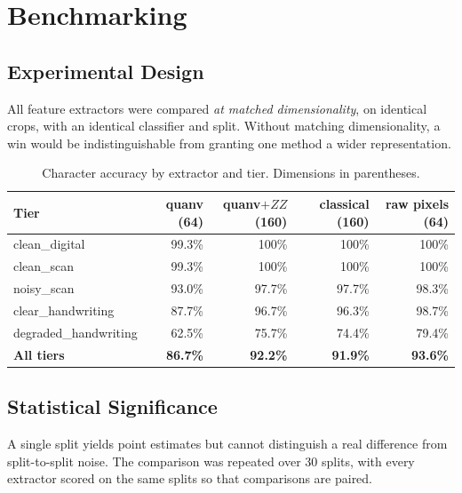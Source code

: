 \documentclass[11pt,a4paper]{article}
\begin{document}
\section{Benchmarking}
\label{sec:features}

\subsection{Experimental Design}

All feature extractors were compared \emph{at matched dimensionality}, on
identical crops, with an identical classifier and split. Without matching
dimensionality, a win would be indistinguishable from granting one method a wider
representation.

\begin{table}[h]
\centering
\caption{Character accuracy by extractor and tier. Dimensions in parentheses.}
\small
\begin{tabular}{@{}lrrrr@{}}
\toprule
Tier & quanv (64) & quanv$+ZZ$ (160) & classical (160) & raw pixels (64) \\
\midrule
clean\_digital & 99.3\% & 100\% & 100\% & 100\% \\
clean\_scan & 99.3\% & 100\% & 100\% & 100\% \\
noisy\_scan & 93.0\% & 97.7\% & 97.7\% & 98.3\% \\
clear\_handwriting & 87.7\% & 96.7\% & 96.3\% & 98.7\% \\
degraded\_handwriting & 62.5\% & 75.7\% & 74.4\% & 79.4\% \\
\midrule
\textbf{All tiers} & \textbf{86.7\%} & \textbf{92.2\%} & \textbf{91.9\%} & \textbf{93.6\%} \\
\bottomrule
\end{tabular}
\end{table}

\subsection{Statistical Significance}

A single split yields point estimates but cannot distinguish a real difference
from split-to-split noise. The comparison was repeated over 30 splits, with every
extractor scored on the same splits so that comparisons are paired.
\end{document}
